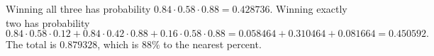 Winning all three has probability $0.84\cdot0.58\cdot0.88=0.428736$. Winning exactly two has probability
\[0.84\cdot0.58\cdot0.12+0.84\cdot0.42\cdot0.88+0.16\cdot0.58\cdot0.88=0.058464+0.310464+0.081664=0.450592.\]
The total is $0.879328$, which is $\boxed{88\%}$ to the nearest percent.
